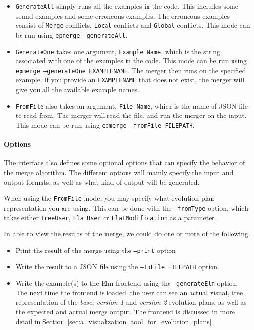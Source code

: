 \documentclass[a4paper,english]{ifimaster}
\begin{document}
\begin{itemize}
\item \texttt{GenerateAll} simply runs all the examples in the code. This includes some sound examples and some erroneous examples. The erroneous examples consist of \texttt{Merge} conflicts, \texttt{Local} conflicts and \texttt{Global} conflicts. This mode can be run using \texttt{epmerge --generateAll}.
\item \texttt{GenerateOne} takes one argument, \texttt{Example Name}, which is the string associated with one of the examples in the code. This mode can be run using \texttt{epmerge --generateOne EXAMPLENAME}. The merger then runs on the specified example. If you provide an \texttt{EXAMPLENAME} that does not exist, the merger will give you all the available example names.
\item \texttt{FromFile} also takes an argument, \texttt{File Name}, which is the name of JSON file to read from. The merger will read the file, and run the merger on the input. This mode can be run using \texttt{epmerge --fromFile FILEPATH}.
\end{itemize}

\paragraph{Options}%
\label{par:options}

The interface also defines some optional options that can specify the behavior of the merge algorithm. The different options will mainly specify the input and output formats, as well as what kind of output will be generated.

When using the \texttt{FromFile} mode, you may specify what evolution plan representation you are using. This can be done with the \texttt{--fromType} option, which takes either \texttt{TreeUser}, \texttt{FlatUser} or \texttt{FlatModification} as a parameter.

In able to view the results of the merge, we could do one or more of the following.

\begin{itemize}
  \item Print the result of the merge using the \texttt{--print} option
  \item Write the result to a JSON file using the \texttt{--toFile FILEPATH} option.
  \item Write the example(s) to the Elm frontend using the \texttt{--generateElm} option. The next time the frontend is loaded, the user can see an actual visual, tree representation of the \textit{base}, \textit{version 1} and \textit{version 2} evolution plans, as well as the expected and actual merge output. The frontend is discussed in more detail in Section~\vref{sec:a_visualization_tool_for_evolution_plans}.
\end{itemize}
\end{document}
